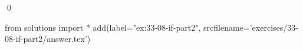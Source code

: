 
\begin{ex}
  \label{ex:33-08-if-part2}
  
  \qed
\end{ex}
\begin{python0}
from solutions import *
add(label="ex:33-08-if-part2",
    srcfilename='exercises/33-08-if-part2/answer.tex')
\end{python0}
